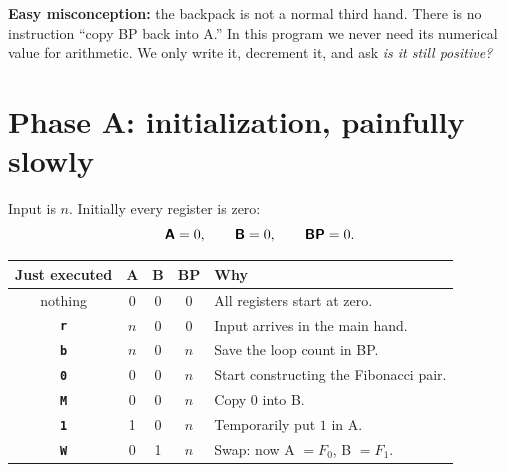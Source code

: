 \documentclass[11pt,a4paper]{article}
\newcommand{\op}[1]{\texttt{\bfseries #1}}
\newcommand{\reg}[1]{\textsf{\bfseries #1}}
\newcommand{\Fib}[1]{F_{#1}}
\begin{document}
\begin{warningbox}
  \textbf{Easy misconception:} the backpack is not a normal third hand.
  There is no instruction ``copy BP back into A.'' In this program we never
  need its numerical value for arithmetic. We only write it, decrement it,
  and ask \emph{is it still positive?}
\end{warningbox}

\section{Phase A: initialization, painfully slowly}

Input is \(n\). Initially every register is zero:
\[
  \reg{A}=0,\qquad \reg{B}=0,\qquad \reg{BP}=0.
\]

\begin{center}
\end{center}

\begin{center}
\small
\begin{tabular}{c|c|c|c|p{6.4cm}}
  \toprule
  \textbf{Just executed} & \reg{A} & \reg{B} & \reg{BP} & \textbf{Why}\\
  \midrule
  nothing & 0 & 0 & 0 & All registers start at zero.\\
  \op{r} & \(n\) & 0 & 0 & Input arrives in the main hand.\\
  \op{b} & \(n\) & 0 & \(n\) & Save the loop count in BP.\\
  \op{0} & 0 & 0 & \(n\) & Start constructing the Fibonacci pair.\\
  \op{M} & 0 & 0 & \(n\) & Copy \(0\) into B.\\
  \op{1} & 1 & 0 & \(n\) & Temporarily put \(1\) in A.\\
  \op{W} & 0 & 1 & \(n\) & Swap: now A \(=\Fib0\), B \(=\Fib1\).\\
  \bottomrule
\end{tabular}
\end{center}
\end{document}
